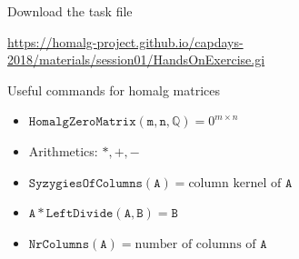 \documentclass{beamer}
\newcommand{\urltaskfile}{\href{https://homalg-project.github.io/capdays-2018/materials/session01/HandsOnExercise.gi}{\url{https://homalg-project.github.io/capdays-2018/materials/session01/HandsOnExercise.gi}}}
\newcommand{\Q}{\mathbb{Q}}
\begin{document}
\begin{frame}
  \begin{block}{Download the task file}
    \begin{center}
        \urltaskfile 
    \end{center}
  \end{block}
  \begin{block}{Useful commands for homalg matrices}
   \begin{itemize}
    \item $\mathtt{HomalgZeroMatrix(m,n,\Q)} = 0^{m \times n}$
    \item Arithmetics: $\mathtt{\ast}, \mathtt{+}, \mathtt{-}$
    \item $\mathtt{SyzygiesOfColumns(A)} = \text{column kernel of $\texttt{A}$}$
    \item $\mathtt{A \ast LeftDivide(A,B) = B}$
    \item $\mathtt{NrColumns(A)} = \text{number of columns of $\texttt{A}$}$
   \end{itemize}

  \end{block}
\end{frame}
\end{document}
